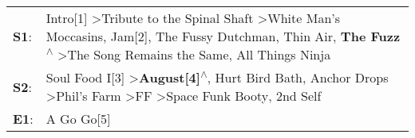 \begin{supertabular}{p{0.03\textwidth}p{0.92\textwidth}}
 \textbf{S1}:  &  Intro[1]\textsuperscript{} \textgreater \enspace Tribute to the Spinal Shaft\textsuperscript{} \textgreater \enspace White Man's Moccasins\textsuperscript{}, \enspace Jam[2]\textsuperscript{}, \enspace The Fussy Dutchman\textsuperscript{}, \enspace Thin Air\textsuperscript{}, \enspace \textbf{The Fuzz\textsuperscript{$\wedge$}} \textgreater \enspace The Song Remains the Same\textsuperscript{}, \enspace All Things Ninja\textsuperscript{}  \enspace  \\
 \textbf{S2}:  &                                                                      Soul Food I[3]\textsuperscript{} \textgreater \enspace \textbf{August[4]\textsuperscript{$\wedge$}}, \enspace Hurt Bird Bath\textsuperscript{}, \enspace Anchor Drops\textsuperscript{} \textgreater \enspace Phil's Farm\textsuperscript{} \textgreater \enspace FF\textsuperscript{} \textgreater \enspace Space Funk Booty\textsuperscript{}, \enspace 2nd Self\textsuperscript{}  \enspace  \\
 \textbf{E1}:  &                                                                                                                                                                                                                                                                                                                                                                                                                              A Go Go[5]\textsuperscript{}  \enspace  \\
\end{supertabular}
